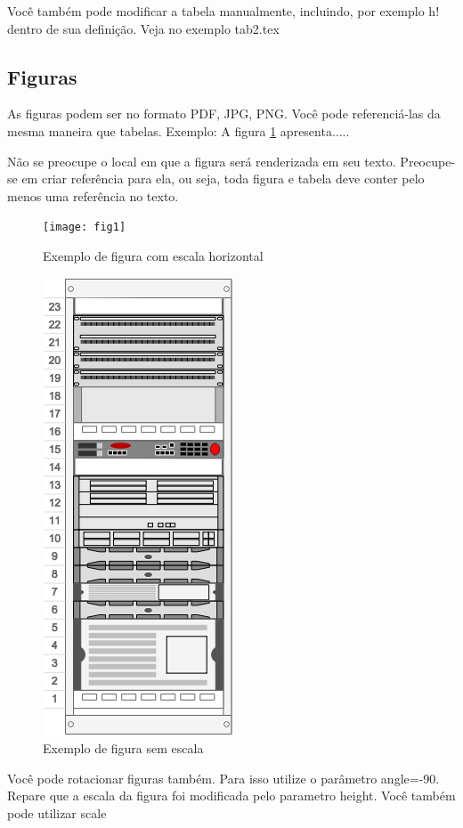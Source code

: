 \documentclass[	DIV=calc,%
							paper=a4,%
							fontsize=12pt,%
							onecolumn]{scrartcl}	 					%
\begin{document}
Você também pode modificar a tabela manualmente, incluindo, por exemplo h! dentro de sua definição. Veja no exemplo tab2.tex

\subsection{Figuras}

As figuras podem ser no formato PDF, JPG, PNG. Você pode referenciá-las da mesma maneira que tabelas. Exemplo: A figura \ref{fig1} apresenta.....

Não se preocupe o local em que a figura será renderizada em seu texto. Preocupe-se em criar referência para ela, ou seja, toda figura e tabela deve conter pelo menos uma referência no texto.

\begin{figure}
\centering
\texttt{[image: fig1]}
\caption{Exemplo de figura com escala horizontal}
\label{fig1}
\end{figure}


\begin{figure}
	\centering
	\includegraphics[]{fig2}
	\caption{Exemplo de figura sem escala}
	\label{fig2}
\end{figure}

Você pode rotacionar figuras também. Para isso utilize o parâmetro angle=-90. Repare que a escala da figura foi modificada pelo parametro height. Você também pode utilizar scale
\end{document}
